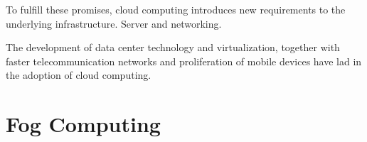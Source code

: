 
To fulfill these promises, cloud computing introduces new requirements to the underlying infrastructure. Server and networking.

The development of data center technology and virtualization, together with faster telecommunication networks and proliferation of mobile devices have lad in the adoption of cloud computing.





\section{Fog Computing}
\label{section:fog-computing}

